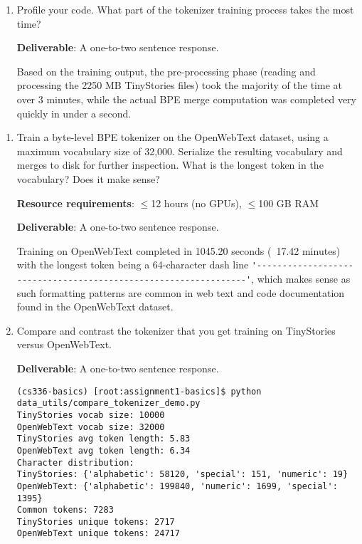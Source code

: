 \begin{enumerate}[label=(\alph*)]
    \item Profile your code. What part of the tokenizer training process takes the most time?
    
    \textbf{Deliverable}: A one-to-two sentence response.
    
    \begin{answer}
    Based on the training output, the pre-processing phase (reading and processing the 2250 MB TinyStories files) took the majority of the time at over 3 minutes, while the actual BPE merge computation was completed very quickly in under a second.
    \end{answer}
\end{enumerate}


\begin{enumerate}[label=(\alph*)]
    \item Train a byte-level BPE tokenizer on the OpenWebText dataset, using a maximum vocabulary size of 32,000. Serialize the resulting vocabulary and merges to disk for further inspection. What is the longest token in the vocabulary? Does it make sense?
    
    \textbf{Resource requirements}: $\le$12 hours (no GPUs), $\le$100 GB RAM
    
    \textbf{Deliverable}: A one-to-two sentence response.
    
    \begin{answer}
    Training on OpenWebText completed in 1045.20 seconds (~17.42 minutes) with the longest token being a 64-character dash line \lstinline{'----------------------------------------------------------------'}, which makes sense as such formatting patterns are common in web text and code documentation found in the OpenWebText dataset.
    \end{answer}

    \item Compare and contrast the tokenizer that you get training on TinyStories versus OpenWebText.

    \textbf{Deliverable}: A one-to-two sentence response.

    \begin{lstlisting}
(cs336-basics) [root:assignment1-basics]$ python data_utils/compare_tokenizer_demo.py 
TinyStories vocab size: 10000
OpenWebText vocab size: 32000
TinyStories avg token length: 5.83
OpenWebText avg token length: 6.34
Character distribution:
TinyStories: {'alphabetic': 58120, 'special': 151, 'numeric': 19}
OpenWebText: {'alphabetic': 199840, 'numeric': 1699, 'special': 1395}
Common tokens: 7283
TinyStories unique tokens: 2717
OpenWebText unique tokens: 24717


\end{lstlisting}
\end{enumerate}
